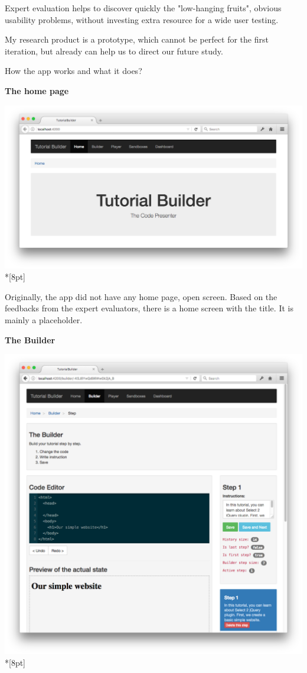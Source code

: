 \documentclass[12pt, a4paper, oneside, openright, medskipamount]{report}
\begin{document}
Expert evaluation helps to discover quickly the "low-hanging fruits", obvious usability problems, without investing extra resource for a wide user testing.

My research product is a prototype, which cannot be perfect for the first iteration, but already can help us to direct our future study.

How the app works and what it does?

\newpage

\textbf{The home page}

\includegraphics[width=1\textwidth]{assets/tour-screenshots/home-page.png}\\*[8pt]

Originally, the app did not have any home page, open screen. Based on the feedbacks from the expert evaluators, there is a home screen with the title. It is mainly a placeholder.

\newpage

\textbf{The Builder}

\includegraphics[width=1\textwidth]{assets/tour-screenshots/the-builder.png}\\*[8pt]
\end{document}
